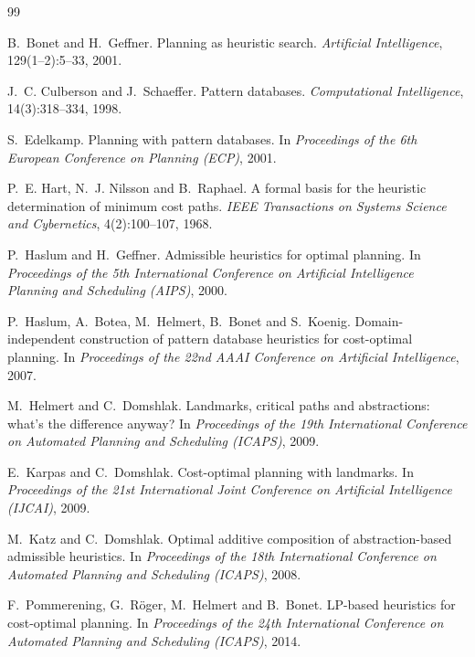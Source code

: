 \documentclass[10pt,twocolumn,a4paper]{article}
\theoremstyle{plain}
\theoremstyle{definition}
\theoremstyle{remark}
\begin{document}
\begin{thebibliography}{99}
\small

B.~Bonet and H.~Geffner.
\newblock Planning as heuristic search.
\newblock \emph{Artificial Intelligence}, 129(1--2):5--33, 2001.

J.~C. Culberson and J.~Schaeffer.
\newblock Pattern databases.
\newblock \emph{Computational Intelligence}, 14(3):318--334, 1998.

S.~Edelkamp.
\newblock Planning with pattern databases.
\newblock In \emph{Proceedings of the 6th European Conference on Planning
  (ECP)}, 2001.

P.~E. Hart, N.~J. Nilsson and B.~Raphael.
\newblock A formal basis for the heuristic determination of minimum cost paths.
\newblock \emph{IEEE Transactions on Systems Science and Cybernetics},
  4(2):100--107, 1968.

P.~Haslum and H.~Geffner.
\newblock Admissible heuristics for optimal planning.
\newblock In \emph{Proceedings of the 5th International Conference on Artificial
  Intelligence Planning and Scheduling (AIPS)}, 2000.

P.~Haslum, A.~Botea, M.~Helmert, B.~Bonet and S.~Koenig.
\newblock Domain-independent construction of pattern database heuristics for
  cost-optimal planning.
\newblock In \emph{Proceedings of the 22nd AAAI Conference on Artificial
  Intelligence}, 2007.

M.~Helmert and C.~Domshlak.
\newblock Landmarks, critical paths and abstractions: what's the difference
  anyway?
\newblock In \emph{Proceedings of the 19th International Conference on Automated
  Planning and Scheduling (ICAPS)}, 2009.

E.~Karpas and C.~Domshlak.
\newblock Cost-optimal planning with landmarks.
\newblock In \emph{Proceedings of the 21st International Joint Conference on
  Artificial Intelligence (IJCAI)}, 2009.

M.~Katz and C.~Domshlak.
\newblock Optimal additive composition of abstraction-based admissible
  heuristics.
\newblock In \emph{Proceedings of the 18th International Conference on Automated
  Planning and Scheduling (ICAPS)}, 2008.

F.~Pommerening, G.~R\"oger, M.~Helmert and B.~Bonet.
\newblock LP-based heuristics for cost-optimal planning.
\newblock In \emph{Proceedings of the 24th International Conference on Automated
  Planning and Scheduling (ICAPS)}, 2014.


\end{thebibliography}
\end{document}
